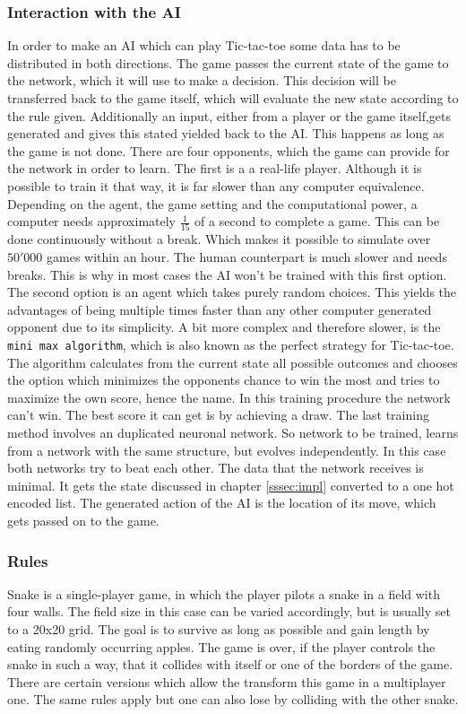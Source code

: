 \documentclass[12pt]{article}
\begin{document}
\subsubsection{Interaction with the AI}
In order to make an AI which can play Tic-tac-toe some data has to be distributed in both directions. The game passes the current state of the game to the network, which it will use to make a decision. This decision will be transferred back to the game itself, which will evaluate the new state according to the rule given. Additionally an input, either from a player or the game itself,gets generated and gives this stated yielded back to the AI. This happens as long as the game is not done. There are four opponents, which the game can provide for the network in order to learn. The first is a a real-life player. Although it is possible to train it that way, it is far slower than any computer equivalence. Depending on the agent, the game setting and the computational power,  a computer needs approximately $\frac{1}{15}$ of a second to complete a game. This can be done continuously without a break. Which makes it possible to simulate over $50'000$ games within an hour. The human counterpart is much slower and needs breaks. This is why in most cases the AI won't be trained with this first option. The second option is an agent which takes purely random choices. This yields the advantages of being multiple times faster than any other computer generated opponent due to its simplicity. A bit more complex and therefore slower, is the \lstinline{mini max algorithm}, which is also known as the perfect strategy for Tic-tac-toe. The algorithm calculates from the current state all possible outcomes and chooses the option which minimizes the opponents chance to win the most and  tries to maximize the own score, hence the name. In this training procedure the network can't win. The best score it can get is by achieving a draw. The last training method involves an duplicated neuronal network. So network to be trained, learns from a network with the same structure, but evolves independently. In this case both networks try to beat each other. The data that the network receives is minimal. It gets the state discussed in chapter \ref{sssec:impl} converted to a one hot encoded list. The generated action of the AI is the location of its move, which gets passed on to the game.
\subsubsection{Rules}
Snake is a single-player game, in which the player pilots a snake in a field with four walls. The field size in this case can be varied accordingly, but is usually set to a 20x20 grid. The goal is to survive as long as possible and gain length by eating randomly occurring apples. The game is over, if the player controls the snake in such a way, that it collides with itself or one of the borders of the game. There are certain versions which allow the transform this game in a multiplayer one. The same rules apply but one can also lose by colliding with the other snake.
\end{document}
